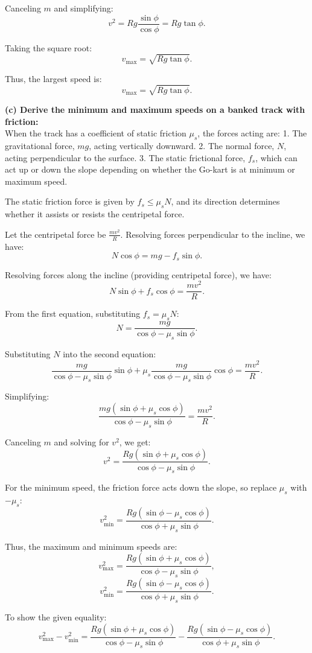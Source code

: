 \documentclass{article}
\begin{document}
Canceling $m$ and simplifying:
\[
v^2 = Rg \frac{\sin\phi}{\cos\phi} = Rg \tan\phi.
\]

Taking the square root:
\[
v_{\text{max}} = \sqrt{Rg \tan\phi}.
\]

Thus, the largest speed is:
\[
\boxed{v_{\text{max}} = \sqrt{Rg \tan\phi}}.
\]

\textbf{(c) Derive the minimum and maximum speeds on a banked track with friction:} \\[1em]
When the track has a coefficient of static friction $\mu_s$, the forces acting are:
1. The gravitational force, $mg$, acting vertically downward.
2. The normal force, $N$, acting perpendicular to the surface.
3. The static frictional force, $f_s$, which can act up or down the slope depending on whether the Go-kart is at minimum or maximum speed.

The static friction force is given by $f_s \leq \mu_s N$, and its direction determines whether it assists or resists the centripetal force.

Let the centripetal force be $\frac{mv^2}{R}$. Resolving forces perpendicular to the incline, we have:
\[
N\cos\phi = mg - f_s\sin\phi.
\]

Resolving forces along the incline (providing centripetal force), we have:
\[
N\sin\phi + f_s\cos\phi = \frac{mv^2}{R}.
\]

From the first equation, substituting $f_s = \mu_s N$:
\[
N = \frac{mg}{\cos\phi - \mu_s \sin\phi}.
\]

Substituting $N$ into the second equation:
\[
\frac{mg}{\cos\phi - \mu_s \sin\phi} \sin\phi + \mu_s \frac{mg}{\cos\phi - \mu_s \sin\phi} \cos\phi = \frac{mv^2}{R}.
\]

Simplifying:
\[
\frac{mg (\sin\phi + \mu_s \cos\phi)}{\cos\phi - \mu_s \sin\phi} = \frac{mv^2}{R}.
\]

Canceling $m$ and solving for $v^2$, we get:
\[
v^2 = \frac{Rg (\sin\phi + \mu_s \cos\phi)}{\cos\phi - \mu_s \sin\phi}.
\]

For the minimum speed, the friction force acts down the slope, so replace $\mu_s$ with $-\mu_s$:
\[
v_{\text{min}}^2 = \frac{Rg (\sin\phi - \mu_s \cos\phi)}{\cos\phi + \mu_s \sin\phi}.
\]

Thus, the maximum and minimum speeds are:
\[
v_{\text{max}}^2 = \frac{Rg (\sin\phi + \mu_s \cos\phi)}{\cos\phi - \mu_s \sin\phi},
\]
\[
v_{\text{min}}^2 = \frac{Rg (\sin\phi - \mu_s \cos\phi)}{\cos\phi + \mu_s \sin\phi}.
\]

To show the given equality:
\[
v_{\text{max}}^2 - v_{\text{min}}^2 = \frac{Rg (\sin\phi + \mu_s \cos\phi)}{\cos\phi - \mu_s \sin\phi} - \frac{Rg (\sin\phi - \mu_s \cos\phi)}{\cos\phi + \mu_s \sin\phi}.
\]
\end{document}
